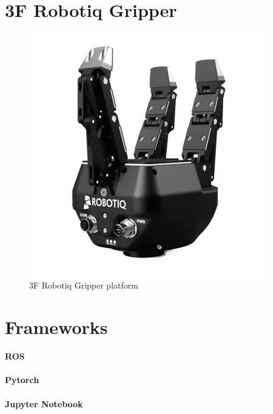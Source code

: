 \section{3F Robotiq Gripper}
\begin{figure}
	\centering
	\includegraphics[width=0.5\linewidth]{Images/gripper3f.png}
	\caption{3F Robotiq Gripper platform}
	\label{fig:gripper3f}
\end{figure}
\section{Frameworks}
\paragraph{ROS}
\paragraph{Pytorch}
\paragraph{Jupyter Notebook}